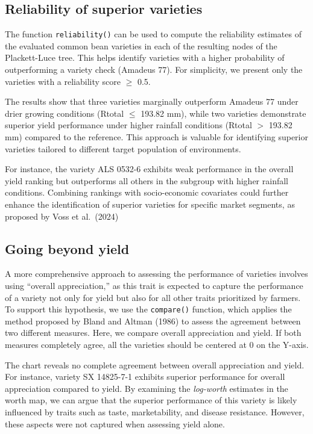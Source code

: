 \documentclass[
]{book}
\begin{document}
\subsection{Reliability of superior varieties}\label{reliability-of-superior-varieties}

The function \texttt{reliability()} can be used to compute the reliability estimates \citep{eskridge_1992} of the evaluated common bean varieties in each of the resulting nodes of the Plackett-Luce tree. This helps identify varieties with a higher probability of outperforming a variety check (Amadeus 77). For simplicity, we present only the varieties with a reliability score \(\geq\) 0.5.

The results show that three varieties marginally outperform Amadeus 77 under drier growing conditions (Rtotal \(\leq\) 193.82 mm), while two varieties demonstrate superior yield performance under higher rainfall conditions (Rtotal \(>\) 193.82 mm) compared to the reference. This approach is valuable for identifying superior varieties tailored to different target population of environments.

For instance, the variety ALS 0532-6 exhibits weak performance in the overall yield ranking but outperforms all others in the subgroup with higher rainfall conditions. Combining rankings with socio-economic covariates could further enhance the identification of superior varieties for specific market segments, as proposed by Voss et al.~(2024) \citep{Voss2024}

\subsection{Going beyond yield}\label{going-beyond-yield}

A more comprehensive approach to assessing the performance of varieties involves using ``overall appreciation,'' as this trait is expected to capture the performance of a variety not only for yield but also for all other traits prioritized by farmers. To support this hypothesis, we use the \texttt{compare()} function, which applies the method proposed by Bland and Altman (1986) \citep{MartinBland1986} to assess the agreement between two different measures. Here, we compare overall appreciation and yield. If both measures completely agree, all the varieties should be centered at 0 on the Y-axis.

The chart reveals no complete agreement between overall appreciation and yield. For instance, variety SX 14825-7-1 exhibits superior performance for overall appreciation compared to yield. By examining the \emph{log-worth} estimates in the worth map, we can argue that the superior performance of this variety is likely influenced by traits such as taste, marketability, and disease resistance. However, these aspects were not captured when assessing yield alone.
\end{document}
